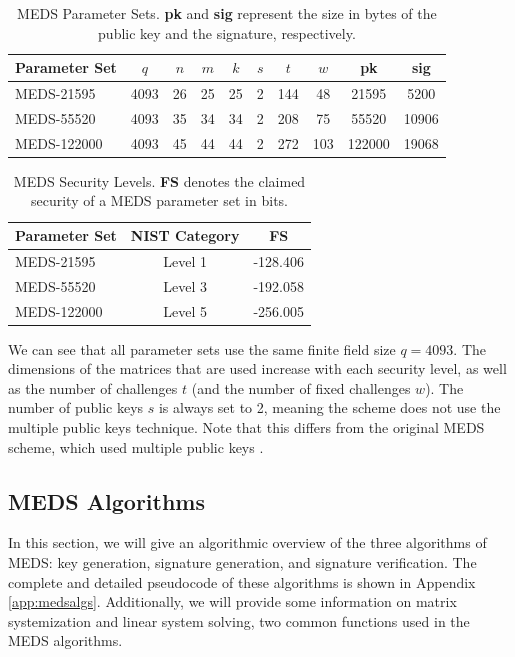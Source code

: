 \documentclass[11pt,a4paper]{report}
\theoremstyle{definition}
\begin{document}
\begin{table}
  \centering
  \begin{tabular}{lccccccccc}
    \toprule
    \textbf{Parameter Set} & \textbf{$q$} & \textbf{$n$} & \textbf{$m$} & \textbf{$k$} & \textbf{$s$} & \textbf{$t$} & \textbf{$w$} & \textbf{pk} & \textbf{sig} \\
    \midrule
    MEDS-21595 & 4093 & 26 & 25 & 25 & 2 & 144 & 48 & 21595 & 5200 \\
    MEDS-55520 & 4093 & 35 & 34 & 34 & 2 & 208 & 75 & 55520 & 10906 \\
    MEDS-122000 & 4093 & 45 & 44 & 44 & 2 & 272 & 103 & 122000 & 19068 \\
    \bottomrule
  \end{tabular}
  \caption{MEDS Parameter Sets. \textbf{pk} and \textbf{sig} represent the size in bytes of the public key and the signature, respectively.}
  \label{tab:medsparametersets}
\end{table}

\begin{table}
  \centering
  \begin{tabular}{lcc}
    \toprule
    \textbf{Parameter Set} & \textbf{NIST Category} & \textbf{FS} \\
    \midrule
    MEDS-21595 & Level 1 & -128.406 \\
    MEDS-55520 & Level 3 & -192.058 \\
    MEDS-122000 & Level 5 & -256.005 \\
    \bottomrule
  \end{tabular}
  \caption{MEDS Security Levels. \textbf{FS} denotes the claimed security of a MEDS parameter set in bits.}
  \label{tab:medssecuritylevels}
\end{table}

We can see that all parameter sets use the same finite field size $q = 4093$. The dimensions of the matrices that are used increase with each security level, as well as the number of challenges $t$ (and the number of fixed challenges $w$). The number of public keys $s$ is always set to 2, meaning the scheme does not use the multiple public keys technique. Note that this differs from the original MEDS scheme, which used multiple public keys \cite{chou2023meds}.

\subsection{MEDS Algorithms}
\label{sec:medsalgorithms}
In this section, we will give an algorithmic overview of the three algorithms of MEDS: key generation, signature generation, and signature verification. The complete and detailed pseudocode of these algorithms is shown in Appendix \ref{app:medsalgs}. Additionally, we will provide some information on matrix systemization and linear system solving, two common functions used in the MEDS algorithms.
\end{document}
